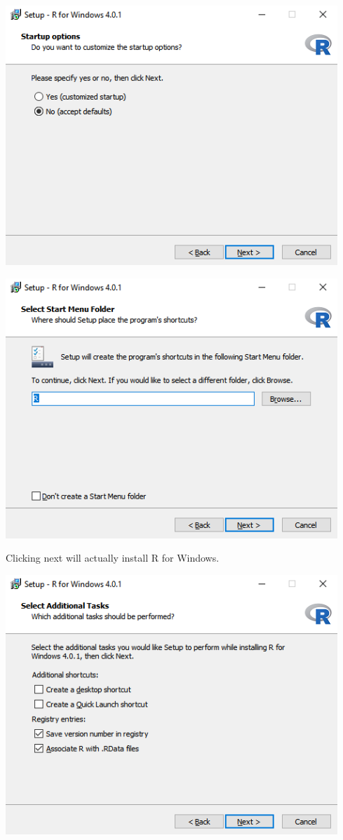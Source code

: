 \documentclass[
]{book}
\begin{document}
\includegraphics{images/05-r_8.png}

\includegraphics{images/05-r_9.png}

Clicking next will actually install R for Windows.

\includegraphics{images/05-r_10.png}
\end{document}
